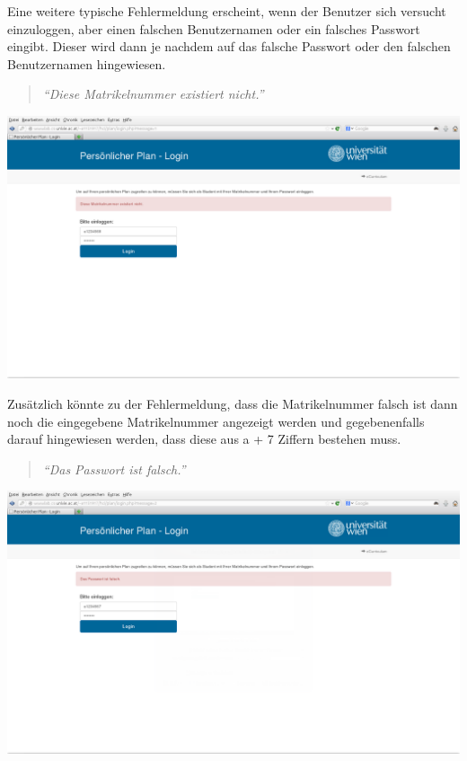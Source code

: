 \documentclass[a4paper,10pt]{scrartcl}
\begin{document}
Eine weitere typische Fehlermeldung erscheint, wenn der Benutzer sich versucht einzuloggen, aber einen falschen Benutzernamen oder ein falsches Passwort eingibt.
Dieser wird dann je nachdem auf das falsche Passwort oder den falschen Benutzernamen hingewiesen.

\begin{quote}
 \textit{``Diese Matrikelnummer existiert nicht.''}
\end{quote} 

\begin{center}
 \includegraphics[scale=0.4]{./fehlermeldung2.png}
\end{center}

Zusätzlich könnte zu der Fehlermeldung, dass die Matrikelnummer falsch ist dann noch die eingegebene Matrikelnummer angezeigt werden und gegebenenfalls darauf hingewiesen
werden, dass diese aus a + 7 Ziffern bestehen muss.

\begin{quote}
 \textit{``Das Passwort ist falsch.''}
\end{quote} 

\begin{center}
 \includegraphics[scale=0.4]{./fehlermeldung3.png}
\end{center}
\end{document}
